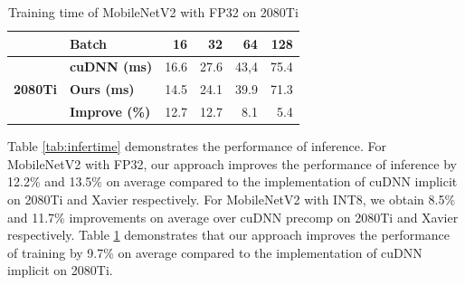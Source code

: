\begin{table}[]

    \caption{Training time of MobileNetV2 with FP32 on 2080Ti}
    \vspace{-3mm}
    \label{tab:traintime}
    \centering
    \begin{threeparttable}
    \begin{tabular}{c|l|rrrr}
    \toprule
    &\textbf{Batch} & 16& 32 &64 & 128\\
    \midrule
    \multirow{3}{*}{\textbf{2080Ti}}&\textbf{cuDNN (ms)} & 16.6 & 27.6 & 43,4 &75.4 \\
    &\textbf{Ours (ms)} & 14.5  &24.1 &39.9 &71.3\\
    &\textbf{Improve (\%)} &12.7  &12.7 &8.1 &5.4 \\
    \bottomrule
    \end{tabular}
    \footnotesize
    \end{threeparttable}
    \vspace{-5mm}
\end{table}
Table \ref{tab:infertime} demonstrates the performance of inference.
For MobileNetV2 with FP32, our approach improves the performance of inference by 12.2\% and 13.5\% on average compared to the implementation of cuDNN implicit on 2080Ti and Xavier respectively.
For MobileNetV2 with INT8, we obtain 8.5\% and 11.7\% improvements on average over cuDNN precomp on 2080Ti and Xavier respectively.
Table \ref{tab:traintime} demonstrates that our approach improves the performance of training by 9.7\% on average compared to the implementation of cuDNN implicit on 2080Ti.
